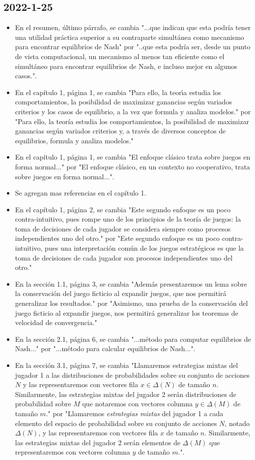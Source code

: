 \documentclass{article}
\begin{document}
\subsection*{2022-1-25}
\begin{itemize}
    \item En el resumen, último párrafo, se cambia "...que indican que esta podría tener una utilidad práctica superior a su contraparte simultánea como mecanismo para encontrar equilibrios de Nash" por "..que esta podría ser, desde un punto de vista computacional, un mecanismo al menos tan eficiente como el simultáneo para encontrar equilibrios de Nash, e incluso mejor en algunos casos.".
    \item En el capítulo 1, página 1, se cambia "Para ello, la teorı́a estudia los comportamientos, la posibilidad de maximizar ganancias según variados criterios y los
    casos de equilibrio, a la vez que formula y analiza modelos." por "Para ello, la teoría estudia los comportamientos, la posibilidad de maximizar ganancias según variados criterios y, a través de diversos conceptos de equilibrios, formula y analiza modelos."
    \item En el capítulo 1, página 1, se cambia "El enfoque clásico trata sobre juegos en forma normal..." por "El enfoque clásico, en un contexto no cooperativo, trata sobre juegos en forma normal...".
    \item Se agregan mas referencias en el capítulo 1.
    \item En el capítulo 1, página 2, se cambia "Este segundo enfoque es un poco contra-intuitivo, pues rompe uno de los principios de la teoría de juegos: la toma de decisiones de cada jugador se considera siempre como procesos independientes uno del otro." por "Este segundo enfoque es un poco contra-intuitivo, pues una interpretación común de los juegos estratégicos es que la toma de decisiones de cada jugador son procesos independientes uno del otro."
    \item En la sección 1.1, página 3, se cambia "Además presentaremos un lema sobre la conservación del juego ficticio al expandir juegos, que nos permitirá generalizar los resultados." por "Asimismo, una prueba de la conservación del juego ficticio al expandir juegos, nos permitirá generalizar los teoremas de velocidad de convergencia."
    \item En la sección 2.1, página 6, se cambia "...método para computar equilibrios de Nash..." por "...método para calcular equilibrios de Nash...".
    \item En la sección 3.1, página 7, se cambia "Llamaremos estrategias mixtas del jugador 1 a las distribuciones de probabilidades sobre su conjunto de acciones $N$ y las representaremos con vectores fila $x \in \Delta(N)$ de tamaño $n$. Similarmente, las estrategias mixtas del jugador 2 serán distribuciones de probabilidad sobre $M$ que notaremos con vectores columna $y \in \Delta(M)$ de tamaño $m$." por "Llamaremos \emph{estrategias mixtas} del jugador 1 a cada elemento del espacio de probabilidad sobre su conjunto de acciones $N$, notado $\Delta(N)$, y las representaremos con vectores fila $x$ de tamaño $n$. Similarmente, las estrategias mixtas del jugador 2 serán elementos de $\Delta(M)$ que representaremos con vectores columna $y$ de tamaño $m$.".

\end{itemize}
\end{document}
